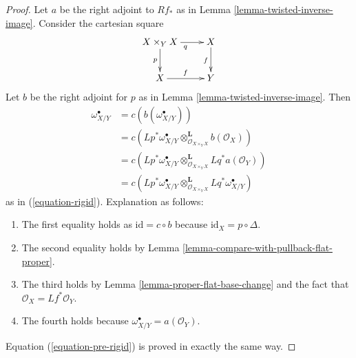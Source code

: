 \documentclass[10pt,a4paper]{amsart}
\theoremstyle{plain}
\theoremstyle{definition}
\theoremstyle{remark}
\numberwithin{equation}{subsection}
\begin{document}
\begin{proof}
Let $a$ be the right adjoint to $Rf_*$ as in
Lemma \ref{lemma-twisted-inverse-image}.
Consider the cartesian square
$$
\xymatrix{
X \times_Y X \ar[r]_q \ar[d]_p & X \ar[d]_f \\
X \ar[r]^f & Y
}
$$
Let $b$ be the right adjoint for $p$
as in Lemma \ref{lemma-twisted-inverse-image}. Then
\begin{align*}
\omega_{X/Y}^\bullet
& =
c(b(\omega_{X/Y}^\bullet)) \\
& =
c(Lp^*\omega_{X/Y}^\bullet
\otimes_{\mathcal{O}_{X \times_Y X}}^\mathbf{L} b(\mathcal{O}_X)) \\
& =
c(Lp^*\omega_{X/Y}^\bullet
\otimes_{\mathcal{O}_{X \times_Y X}}^\mathbf{L}
Lq^*a(\mathcal{O}_Y)) \\
& =
c(Lp^*\omega_{X/Y}^\bullet
\otimes_{\mathcal{O}_{X \times_Y X}}^\mathbf{L}
Lq^*\omega_{X/Y}^\bullet)
\end{align*}
as in (\ref{equation-rigid}). Explanation as follows:
\begin{enumerate}
\item The first equality holds as $\text{id} = c \circ b$ because
$\text{id}_X = p \circ \Delta$.
\item The second equality holds by
Lemma \ref{lemma-compare-with-pullback-flat-proper}.
\item The third holds by Lemma \ref{lemma-proper-flat-base-change}
and the fact that $\mathcal{O}_X = Lf^*\mathcal{O}_Y$.
\item The fourth holds because $\omega_{X/Y}^\bullet = a(\mathcal{O}_Y)$.
\end{enumerate}
Equation (\ref{equation-pre-rigid}) is proved in exactly the same way.
\end{proof}
\end{document}

